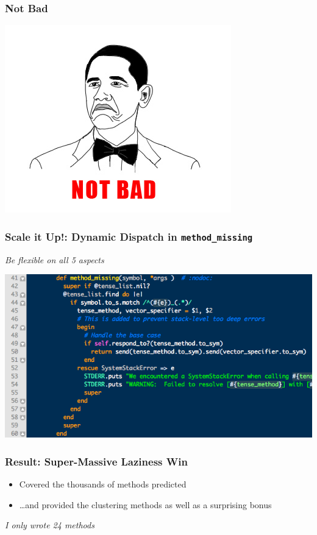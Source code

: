 \documentclass[slidestop,compress,mathserif]{beamer}
\begin{document}
\begin{frame}
	\frametitle{Not Bad}
	\includegraphics[scale=0.75]{img/not_bad.png}
\end{frame}

\begin{frame}
	\frametitle{Scale it Up!: Dynamic Dispatch in \texttt{method\_missing}}
	\begin{center}
		\emph{Be flexible on all 5 aspects}
	\end{center}
	\includegraphics[scale=0.45]{img/lv_mm.png}
\end{frame}

\begin{frame}
	\frametitle{Result:  Super-Massive Laziness Win}
	\begin{itemize}
		\item Covered the thousands of methods predicted
		\pause
		\item \ldots and provided the clustering methods as well as a surprising bonus
	\end{itemize}
	\pause
	\vskip 0.5cm
	\emph{I only wrote 24 methods}
\end{frame}
\end{document}
